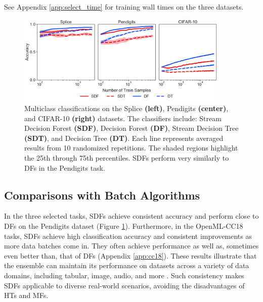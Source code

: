 See Appendix \ref{app:select_time} for training wall times on the three datasets.

\begin{figure}[!htb]
\centering
\includegraphics[width=0.9\textwidth]{select_acc_batch}
  \caption{Multiclass classifications on the Splice \textbf{(left)}, Pendigits \textbf{(center)}, and CIFAR-10 \textbf{(right)} datasets. The classifiers include: Stream Decision Forest \textbf{(SDF)}, Decision Forest \textbf{(DF)}, Stream Decision Tree \textbf{(SDT)}, and Decision Tree \textbf{(DT)}. 
  Each line represents averaged results from 10 randomized repetitions. The shaded regions highlight the 25th through 75th percentiles. SDFs perform very similarly to DFs in the Pendigits task.
  }
\label{fig:select_acc_batch}
\end{figure}

\subsection{Comparisons with Batch Algorithms}
In the three selected tasks, SDFs achieve consistent accuracy and perform close to DFs on the Pendigits dataset (Figure \ref{fig:select_acc_batch}). Furthermore, in the OpenML-CC18 tasks, SDFs achieve high classification accuracy and consistent improvements as more data batches come in. They often achieve performance as well as, sometimes even better than, that of DFs (Appendix \ref{app:cc18}). These results illustrate that the ensemble can maintain its performance on datasets across a variety of data domains, including tabular, image, audio, and more \citep{bischl_openml_2019}. Such consistency makes SDFs applicable to diverse real-world scenarios, avoiding the disadvantages of HTs and MFs.

